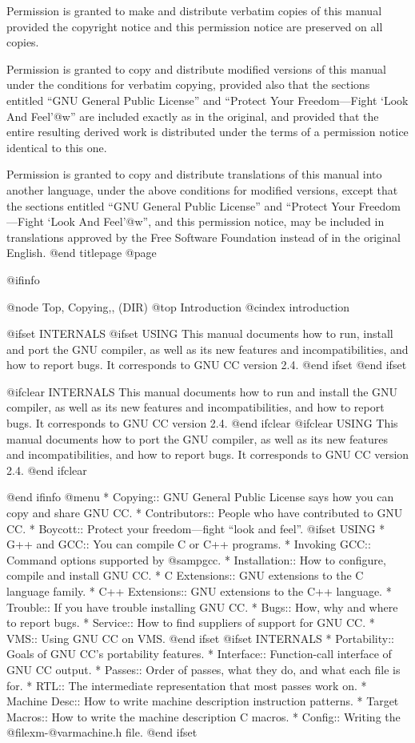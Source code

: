 Permission is granted to make and distribute verbatim copies of
this manual provided the copyright notice and this permission notice
are preserved on all copies.

Permission is granted to copy and distribute modified versions of this
manual under the conditions for verbatim copying, provided also that the
sections entitled ``GNU General Public License'' and ``Protect Your
Freedom---Fight `Look And Feel'@w{}'' are included exactly as in the
original, and provided that the entire resulting derived work is
distributed under the terms of a permission notice identical to this
one.

Permission is granted to copy and distribute translations of this manual
into another language, under the above conditions for modified versions,
except that the sections entitled ``GNU General Public License'' and
``Protect Your Freedom---Fight `Look And Feel'@w{}'', and this
permission notice, may be included in translations approved by the Free
Software Foundation instead of in the original English.
@end titlepage
@page

@ifinfo

@node Top, Copying,, (DIR)
@top Introduction
@cindex introduction

@ifset INTERNALS
@ifset USING
This manual documents how to run, install and port the GNU
compiler, as well as its new features and incompatibilities, and how to
report bugs.  It corresponds to GNU CC version 2.4.
@end ifset
@end ifset

@ifclear INTERNALS
This manual documents how to run and install the GNU compiler,
as well as its new features and incompatibilities, and how to report
bugs.  It corresponds to GNU CC version 2.4.
@end ifclear
@ifclear USING
This manual documents how to port the GNU compiler,
as well as its new features and incompatibilities, and how to report
bugs.  It corresponds to GNU CC version 2.4.
@end ifclear

@end ifinfo
@menu
* Copying::         GNU General Public License says
                     how you can copy and share GNU CC.
* Contributors::    People who have contributed to GNU CC.
* Boycott::	    Protect your freedom---fight ``look and feel''.
@ifset USING
* G++ and GCC::     You can compile C or C++ programs.
* Invoking GCC::    Command options supported by @samp{gcc}.
* Installation::    How to configure, compile and install GNU CC.
* C Extensions::    GNU extensions to the C language family.
* C++ Extensions::  GNU extensions to the C++ language.
* Trouble::         If you have trouble installing GNU CC.
* Bugs::            How, why and where to report bugs.
* Service::         How to find suppliers of support for GNU CC.
* VMS::             Using GNU CC on VMS.
@end ifset
@ifset INTERNALS
* Portability::     Goals of GNU CC's portability features.
* Interface::       Function-call interface of GNU CC output.
* Passes::          Order of passes, what they do, and what each file is for.
* RTL::             The intermediate representation that most passes work on.
* Machine Desc::    How to write machine description instruction patterns.
* Target Macros::   How to write the machine description C macros.
* Config::          Writing the @file{xm-@var{machine}.h} file.
@end ifset

